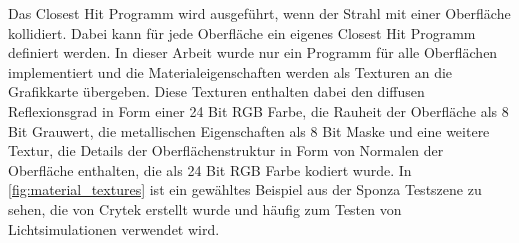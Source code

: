 \documentclass[thesis.tex]{subfiles}
\begin{document}
Das Closest Hit Programm wird ausgeführt, wenn der Strahl mit einer Oberfläche kollidiert. Dabei kann für jede Oberfläche ein eigenes Closest Hit Programm definiert werden. In dieser Arbeit wurde nur ein Programm für alle Oberflächen implementiert und die Materialeigenschaften werden als Texturen an die Grafikkarte übergeben. Diese Texturen enthalten dabei den diffusen Reflexionsgrad in Form einer 24 Bit RGB Farbe, die Rauheit der Oberfläche als 8 Bit Grauwert, die metallischen Eigenschaften als 8 Bit Maske und eine weitere Textur, die Details der Oberflächenstruktur in Form von Normalen der Oberfläche enthalten, die als 24 Bit RGB Farbe kodiert wurde. In \autoref{fig:material_textures} ist ein gewähltes Beispiel aus der Sponza Testszene zu sehen, die von Crytek erstellt wurde und häufig zum Testen von Lichtsimulationen verwendet wird.
\end{document}
